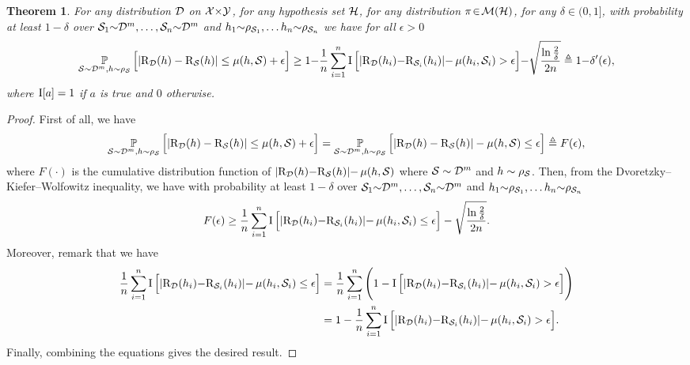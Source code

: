 \documentclass[twoside]{article}
\theoremstyle{plain}
\newtheorem{theorem}{Theorem}
\begin{document}
\begin{theorem}

For any distribution $\mathcal{D}$ on $\mathcal{X}{\times}\mathcal{Y}$, for any hypothesis set $\mathcal{H}$, for any distribution $\pi\!\in\!\mathcal{M}(\mathcal{H})$, for any $\delta\!\in\!(0, 1]$, with probability at least $1{-}\delta$ over $\mathcal{S}_1{\sim}\mathcal{D}^m, \dots, \mathcal{S}_n{\sim}\mathcal{D}^m$ and $h_1{\sim}\rho_{\mathcal{S}_1},\dots h_n{\sim}\rho_{\mathcal{S}_n}$ we have for all $\epsilon{>}0$
\begin{align*}
\operatorname*{\mathbb{P}}_{\mathcal{S}\sim\mathcal{D}^m,h\sim\rho_{\mathcal{S}}}\Big[ |\text{R}_{\mathcal{D}}(h)-\text{R}_{\mathcal{S}}(h)| \le \operatorname{\mu}(h, \mathcal{S}) + \epsilon \Big]\ge1{-}\frac{1}{n}\sum_{i=1}^{n}\operatorname{I}\Big[ |\text{R}_{\mathcal{D}}(h_i){-}\text{R}_{\mathcal{S}_i}(h_i)|{-}\operatorname{\mu}(h_i, \mathcal{S}_i) > \epsilon \Big]{-}\sqrt{\frac{\ln\frac{2}{\delta}}{2n}} \triangleq 1{-}\delta'(\epsilon),
\end{align*}
where $\operatorname{I}[a]=1$ if $a$ is true and $0$ otherwise.
\end{theorem}
\begin{proof}
First of all, we have
\begin{align*}
\operatorname*{\mathbb{P}}_{\mathcal{S}\sim\mathcal{D}^m,h\sim\rho_{\mathcal{S}}}\Big[ |\text{R}_{\mathcal{D}}(h)-\text{R}_{\mathcal{S}}(h)| \le \operatorname{\mu}(h, \mathcal{S}) + \epsilon \Big] = \operatorname*{\mathbb{P}}_{\mathcal{S}\sim\mathcal{D}^m,h\sim\rho_{\mathcal{S}}}\Big[ |\text{R}_{\mathcal{D}}(h)-\text{R}_{\mathcal{S}}(h)| -\operatorname{\mu}(h, \mathcal{S}) \le \epsilon \Big] \triangleq F(\epsilon),  
\end{align*}
where $F(\cdot)$ is the cumulative distribution function of $|\text{R}_{\mathcal{D}}(h){-}\text{R}_{\mathcal{S}}(h)|{-}\operatorname{\mu}(h, \mathcal{S})$ where $\mathcal{S}\sim\mathcal{D}^m$ and $h\sim\rho_{\mathcal{S}}$.
Then, from the Dvoretzky–Kiefer–Wolfowitz inequality, we have with probability at least $1-\delta$ over $\mathcal{S}_1{\sim}\mathcal{D}^m, \dots, \mathcal{S}_n{\sim}\mathcal{D}^m$ and $h_1{\sim}\rho_{\mathcal{S}_1},\dots h_n{\sim}\rho_{\mathcal{S}_n}$
\begin{align*}
F(\epsilon) \ge \frac{1}{n}\sum_{i=1}^{n}\operatorname{I}\Big[ |\text{R}_{\mathcal{D}}(h_i){-}\text{R}_{\mathcal{S}_i}(h_i)|{-}\operatorname{\mu}(h_i, \mathcal{S}_i) \le \epsilon \Big] - \sqrt{\frac{\ln\frac{2}{\delta}}{2n}}.
\end{align*}
Moreover, remark that we have
\begin{align*}
\frac{1}{n}\sum_{i=1}^{n}\operatorname{I}\Big[ |\text{R}_{\mathcal{D}}(h_i){-}\text{R}_{\mathcal{S}_i}(h_i)|{-}\operatorname{\mu}(h_i, \mathcal{S}_i) \le \epsilon \Big] &= \frac{1}{n}\sum_{i=1}^{n}\Bigg(1-\operatorname{I}\Big[ |\text{R}_{\mathcal{D}}(h_i){-}\text{R}_{\mathcal{S}_i}(h_i)|{-}\operatorname{\mu}(h_i, \mathcal{S}_i) > \epsilon \Big]\Bigg)\\
&= 1-\frac{1}{n}\sum_{i=1}^{n}\operatorname{I}\Big[ |\text{R}_{\mathcal{D}}(h_i){-}\text{R}_{\mathcal{S}_i}(h_i)|{-}\operatorname{\mu}(h_i, \mathcal{S}_i) > \epsilon \Big].
\end{align*}
Finally, combining the equations gives the desired result. 
\end{proof}
\end{document}
